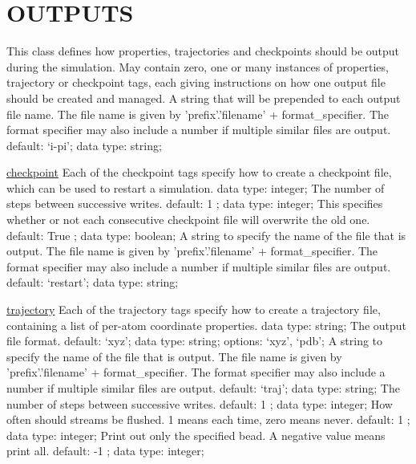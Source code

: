\section{OUTPUTS}
\label{OUTPUTS}
\begin{ipifield}{}%
{This class defines how properties, trajectories and checkpoints should be output during the simulation. May contain zero, one or many instances of properties, trajectory or checkpoint tags, each giving instructions on how one output file should be created and managed.}%
{}%
{%
{A string that will be prepended to each output file name. The file name is given by 'prefix'.'filename' + format\_specifier. The format specifier may also include a number if multiple similar files are output.}%
{default: `i-pi'; data type: string; }%
}
\begin{ipifield}{\hyperref[CHECKPOINT]{checkpoint}}%
{Each of the checkpoint tags specify how to create a checkpoint file, which can be used to restart a simulation. }%
{data type: integer; }%
{%
{The number of steps between successive writes.}%
{default:  1 ; data type: integer; }%
%
{This specifies whether or not each consecutive checkpoint file will overwrite the old one.}%
{default:  True ; data type: boolean; }%
%
{A string to specify the name of the file that is output. The file name is given by 'prefix'.'filename' + format\_specifier. The format specifier may also include a number if multiple similar files are output.}%
{default: `restart'; data type: string; }%
}
\end{ipifield}
\begin{ipifield}{\hyperref[TRAJECTORY]{trajectory}}%
{Each of the trajectory tags specify how to create a trajectory file, containing a list of per-atom coordinate properties. }%
{data type: string; }%
{%
{The output file format.}%
{default: `xyz'; data type: string; options: `xyz', `pdb'; }%
%
{A string to specify the name of the file that is output. The file name is given by 'prefix'.'filename' + format\_specifier. The format specifier may also include a number if multiple similar files are output.}%
{default: `traj'; data type: string; }%
%
{The number of steps between successive writes.}%
{default:  1 ; data type: integer; }%
%
{How often should streams be flushed. 1 means each time, zero means never.}%
{default:  1 ; data type: integer; }%
%
{Print out only the specified bead. A negative value means print all.}%
{default:  -1 ; data type: integer; }%
}
\end{ipifield}
\end{ipifield}

